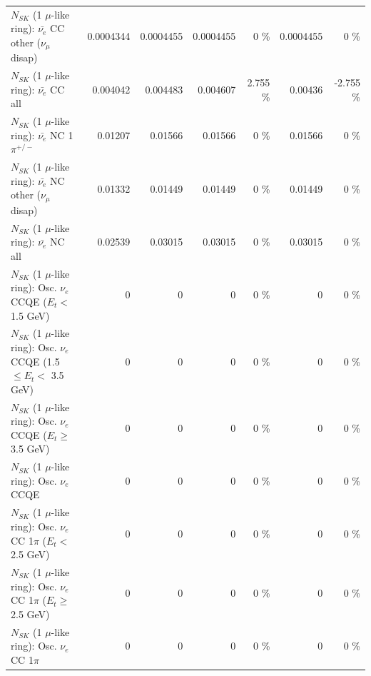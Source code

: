 \begin{table}
\begin{tabular}{| l | r | r | r  r | r  r |}
          $N_{SK}$ (1 $\mu$-like ring): $\bar{\nu_e}$ CC other ($\nu_\mu$ disap) &       0.0004344 &       0.0004455 &       0.0004455 &        0 \%  &       0.0004455 &        0 \%  \\ 
                            $N_{SK}$ (1 $\mu$-like ring): $\bar{\nu_{e}}$ CC all &        0.004042 &        0.004483 &        0.004607 &    2.755 \%  &         0.00436 &   -2.755 \%  \\ 
\hline
                     $N_{SK}$ (1 $\mu$-like ring): $\bar{\nu_e}$ NC 1$\pi^{+/-}$ &         0.01207 &         0.01566 &         0.01566 &        0 \%  &         0.01566 &        0 \%  \\ 
          $N_{SK}$ (1 $\mu$-like ring): $\bar{\nu_e}$ NC other ($\nu_\mu$ disap) &         0.01332 &         0.01449 &         0.01449 &        0 \%  &         0.01449 &        0 \%  \\ 
                            $N_{SK}$ (1 $\mu$-like ring): $\bar{\nu_{e}}$ NC all &         0.02539 &         0.03015 &         0.03015 &        0 \%  &         0.03015 &        0 \%  \\ 
\hline
\hline
\hline
             $N_{SK}$ (1 $\mu$-like ring): Osc. $\nu_e$ CCQE ($E_{t} <$ 1.5 GeV) &               0 &               0 &               0 &        0 \%  &               0 &        0 \%  \\ 
    $N_{SK}$ (1 $\mu$-like ring): Osc. $\nu_e$ CCQE (1.5 $\leq E_{t} <$ 3.5 GeV) &               0 &               0 &               0 &        0 \%  &               0 &        0 \%  \\ 
          $N_{SK}$ (1 $\mu$-like ring): Osc. $\nu_e$ CCQE ($E_{t} \geq$ 3.5 GeV) &               0 &               0 &               0 &        0 \%  &               0 &        0 \%  \\ 
\hline
                                 $N_{SK}$ (1 $\mu$-like ring): Osc. $\nu_e$ CCQE &               0 &               0 &               0 &        0 \%  &               0 &        0 \%  \\ 
\hline
        $N_{SK}$ (1 $\mu$-like ring): Osc. $\nu_e$ CC 1$\pi$ ($E_{t} <$ 2.5 GeV) &               0 &               0 &               0 &        0 \%  &               0 &        0 \%  \\ 
     $N_{SK}$ (1 $\mu$-like ring): Osc. $\nu_e$ CC 1$\pi$ ($E_{t} \geq$ 2.5 GeV) &               0 &               0 &               0 &        0 \%  &               0 &        0 \%  \\ 
\hline
                            $N_{SK}$ (1 $\mu$-like ring): Osc. $\nu_e$ CC 1$\pi$ &               0 &               0 &               0 &        0 \%  &               0 &        0 \%  \\ 

\end{tabular}
\end{table}
